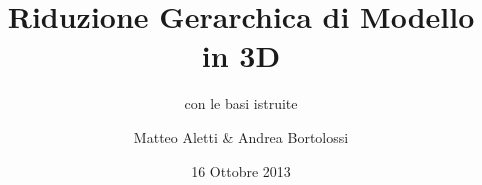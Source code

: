 \documentclass{beamer}
\author[Aletti \& Bortolossi]{Matteo Aletti \& Andrea Bortolossi}
\title[Hi-Mod in 3D]{Riduzione Gerarchica di Modello in 3D}
\subtitle{con le basi istruite}
\institute[PoliMi]{Politecnico di Milano}
\date{16 Ottobre 2013}
\theoremstyle{plain}
\begin{document}
\begin{frame}
\maketitle
\end{frame}
\begin{frame}
\tableofcontents
\end{frame}



\flushlinkimages
\end{document}

